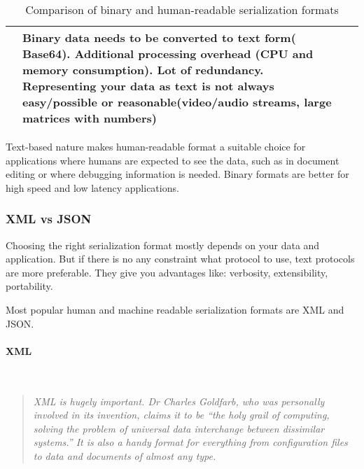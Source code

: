 \begin{table}[h]
\begin{tabularx}{\textwidth}{|X|X|X|}
		&
		
		Binary data needs to be converted to text form( Base64). \newline
		Additional processing overhead (CPU and memory consumption). \newline
		Lot of redundancy.
		Representing your data as text is not always easy/possible or
		reasonable(video/audio streams, large matrices with numbers)
				
				
		\tabularnewline
		\hline
	\end{tabularx} 
	\caption{Comparison of binary and human-readable serialization formats}
	\label{tbl:data_ser_formats}
\end{table}

Text-based nature makes human-readable format a suitable choice
for applications where humans are expected to see the data,
such as in document editing or where debugging information
is needed. Binary formats are better for high speed and low latency
applications.

\subsubsection{XML vs JSON}
Choosing the right serialization format mostly depends on your data and
application. But if there is no any constraint what protocol to use, text
protocols are more preferable. They give you advantages like: verbosity,
extensibility, portability.

Most popular human and machine readable serialization formats are XML and JSON.

\paragraph{XML} ~\\
\begin{quotation}
\textit{
XML is hugely important. Dr Charles Goldfarb, who was personally involved in its
invention, claims it to be “the holy grail of computing, solving the problem of universal data interchange between dissimilar systems.” It is also a handy format for everything from configuration files to data and documents of almost any type.
~\cite{xml_intro}}
\end{quotation} 

